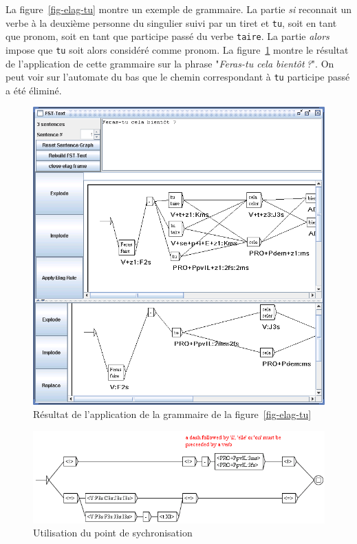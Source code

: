 \bigskip
\noindent La figure~\ref{fig-elag-tu} montre un exemple de grammaire. La partie
\textit{si} reconnait un verbe à la deuxième personne du singulier suivi par un tiret et
\verb+tu+, soit en tant que pronom, soit en tant que participe passé du verbe \verb+taire+. 
La partie \textit{alors} impose que \verb+tu+ soit alors considéré comme pronom. 
La figure~\ref{fig-applying-tu-grammar} montre le résultat de l’application de cette
grammaire sur la phrase "\textit{Feras-tu cela bientôt$~$?}". On peut voir sur l’automate
du bas que le chemin correspondant à \verb+tu+ participe passé a été éliminé.


\begin{figure}[!ht]
\begin{center}
\includegraphics[width=14cm]{resources/img/fig7-13.png}
\caption{Résultat de l’application de la grammaire de la figure~\ref{fig-elag-tu}
\label{fig-applying-tu-grammar}}
\end{center}
\end{figure}

\begin{figure}[!ht]
\begin{center}
\includegraphics[width=14cm]{resources/img/fig7-14.png}
\caption{Utilisation du point de sychronisation\label{fig-synchronization-point}}
\end{center}
\end{figure}

